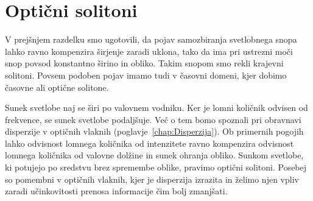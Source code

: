 \section{Optični solitoni}
V prejšnjem razdelku smo ugotovili, da pojav samozbiranja svetlobnega
snopa lahko ravno kompenzira širjenje zaradi uklona, tako da ima pri
ustrezni moči snop povsod konstantno širino in obliko. Takim snopom 
smo rekli krajevni solitoni. Povsem podoben pojav imamo tudi v časovni 
domeni, kjer dobimo časovne ali optične solitone. 

Sunek svetlobe naj se širi po valovnem vodniku. Ker je lomni količnik
odvisen od frekvence, se sunek svetlobe podaljšuje. Več o tem bomo spoznali pri 
obravnavi disperzije v optičnih vlaknih (poglavje~\ref{chap:Disperzija}). 
Ob primernih pogojih lahko odvisnost lomnega količnika od intenzitete 
ravno kompenzira odvisnost lomnega količnika od valovne dolžine in sunek
ohranja obliko. Sunkom svetlobe, ki potujejo po sredstvu brez spremembe
oblike, pravimo optični solitoni. Posebej so pomembni v optičnih vlaknih, 
kjer je disperzija izrazita in želimo njen vpliv zaradi učinkovitosti prenosa
informacije čim bolj zmanjšati. 

